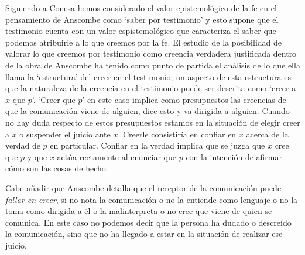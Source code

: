 Siguiendo a Conesa hemos considerado el valor epistemológico de la fe en el pensamiento de Anscombe como `saber por testimonio' y esto supone que el testimonio cuenta con un valor espistemológico que caracteriza el saber que podemos atribuirle a lo que creemos por la fe. El estudio de la posibilidad de valorar lo que creemos por testimonio como creencia verdadera justificada dentro de la obra de Anscombe ha tenido como punto de partida el análisis de lo que ella llama la `estructura' del creer en el testimonio; un aspecto de esta estructura es que la naturaleza de la creencia en el testimonio puede ser descrita como `creer a $x$ que $p$'. `Creer que $p$' en este caso implica como presupuestos las creencias de que la comunicación viene de alguien, dice esto y va dirigida a alguien. Cuando no hay duda respecto de estos presupuestos estamos en la situación de elegir creer a $x$ o suspender el juicio ante $x$. Creerle consistiría en confiar en $x$ acerca de la verdad de $p$ en particular. Confiar en la verdad implica que se juzga que $x$ cree que $p$ y que $x$ actúa rectamente al enunciar que $p$ con la intención de afirmar cómo son las cosas de hecho.

Cabe añadir que Anscombe detalla que el receptor de la comunicación puede \emph{fallar en creer}, si no nota la comunicación o no la entiende como lenguaje o no la toma como dirigida a él o la malinterpreta o no cree que viene de quien se comunica. En este caso no podemos decir que la persona ha dudado o descreído la comunicación, sino que no ha llegado a estar en la situación de realizar ese juicio.

